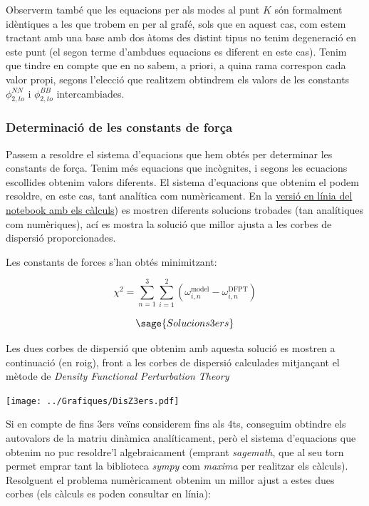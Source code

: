 \documentclass[12pt]{article} %
\begin{document}
{Observerm també que les equacions per als modes al punt $K$ són formalment idèntiques a les que trobem en \cite{falkovsky08_symmet_const_phonon_disper_graph} per al grafé, sols que en aquest cas, com estem tractant amb una base amb dos àtoms des distint tipus no tenim degeneració en este punt (el segon terme d'ambdues equacions es diferent en este cas).
Tenim que tindre en compte que en no sabem, a priori, a quina rama correspon cada valor propi, segons l'elecció que realitzem obtindrem els valors de les constants $\phi_{2,to}^{NN}$ i $\phi_{2,to}^{BB}$ intercambiades.
\newpage

\subsubsection{Determinació de les constants de força}

Passem a resoldre el sistema d'equacions que hem obtés per determinar les constants de força.
Tenim més equacions que incògnites, i segons les ecuacions escollides obtenim valors diferents. El sistema d'equacions que obtenim el podem resoldre, en este cas, tant analítica com numèricament.
En la \href{https://casimirvictoria.github.io/TFG-Semiconductores_2D/index.html}{versió en línia del notebook amb els càlculs}) es mostren diferents solucions trobades (tan analítiques com numèriques), ací es mostra la solució que millor ajusta a les corbes de dispersió proporcionades.

Les constants de forces s'han obtés minimitzant:

\begin{equation}
\chi^2=\sum_{n=1}^3\sum_{i=1}^2\left(\omega_{i,n}^\text{model}-\omega_{i, n}^\text{DFPT}\right)
\end{equation}


\begin{equation}
 \sage{Solucions3ers}
\end{equation}

Les dues corbes de dispersió que obtenim amb aquesta solució es mostren a continuació (en roig), front a les corbes de dispersió calculades mitjançant el mètode de \emph{Density Functional Perturbation Theory}

\begin{center}
\texttt{[image: ../Grafiques/DisZ3ers.pdf]}
\end{center}

Si en compte de fins 3ers veïns considerem fins als 4ts, conseguim obtindre els autovalors de la matriu dinàmica analíticament, però el sistema d'equacions que obtenim no puc resoldre'l algebraicament (emprant \textit{sagemath}, que al seu torn permet emprar tant la biblioteca \textit{sympy} com \textit{maxima} per realitzar els càlculs).  Resolguent el problema numèricament obtenim un millor ajust a estes dues corbes (els càlculs es poden consultar en línia):

}
\end{document}
